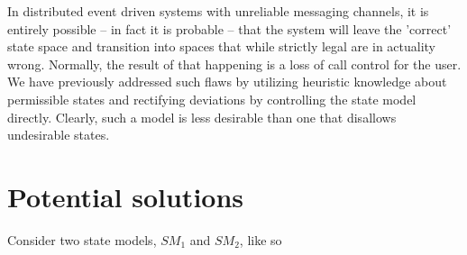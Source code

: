 \documentclass[a4paper]{article}
\begin{document}
In distributed event driven systems with unreliable messaging channels, it is entirely possible -- in fact it is probable -- that the system will leave the 'correct' state space and transition into spaces that while strictly legal are in actuality wrong. Normally, the result of that happening is a loss of call control for the user. We have previously addressed such flaws by utilizing heuristic knowledge about permissible states and rectifying deviations by controlling the state model directly. Clearly, such a model is less desirable than one that disallows undesirable states.

\section{Potential solutions}
Consider two state models, $SM_1$ and $SM_2$, like so

\begin{figure}[ht]
	\begin{center}
		\begin{tikzpicture} [background rectangle/.style={fill=yellow!20}, framed,show
			background rectangle,yscale=1.5,thin,>=stealth,thick,
			every transition/.style={fill,minimum width=1mm,minimum height=7mm},
			original state/.style={blue!50!black!50,top color=white,bottom color=blue!20},
			input state/.style={red!50!black!50,top color=white,bottom color=red!20},
			control state/.style={green!50!black!50,top color=white,bottom color=green!20},
			every place/.style={draw,very thick,minimum size=6mm},
			inhibitor/.style={o-},
			exhaust/.style={red!70!black!70!,top color=red!20,bottom color=red}
			]

\end{tikzpicture}\end{center}\end{figure}
\end{document}
